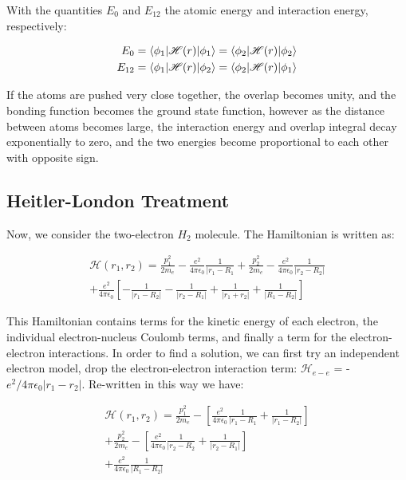 With the quantities $E_0$ and $E_{12}$ the atomic energy and interaction energy, respectively:

\begin{eqnarray}
E_0=\braket{\phi_1|\mathscr{H}(r)|\phi_1} =\braket{\phi_2|\mathscr{H}(r)|\phi_2}\\
E_{12}=\braket{\phi_1|\mathscr{H}(r)|\phi_2} =\braket{\phi_2|\mathscr{H}(r)|\phi_1}
\end{eqnarray}

If the atoms are pushed very close together, the overlap becomes unity, and the bonding function becomes the ground state function, however as the distance between atoms becomes large, the interaction energy and overlap integral decay exponentially to zero, and the two energies become proportional to each other with opposite sign. 


\subsection{Heitler-London Treatment}

Now, we consider the two-electron $H_2$ molecule. The Hamiltonian is written as:

\begin{eqnarray}
\mathscr{H}(r_1,r_2) = \frac{p^2_1}{2m_e}-\frac{e^2}{4\pi\epsilon_0}\frac{1}{|r_1-R_1}+\frac{p_2^2}{2m_e}-\frac{e^2}{4\pi\epsilon_0}\frac{1}{|r_2-R_2|} \\
+\frac{e^2}{4\pi\epsilon_0}\left[-\frac{1}{|r_1-R_2|}-\frac{1}{|r_2-R_1|}+\frac{1}{|r_1+r_2|}+\frac{1}{|R_1-R_2|}\right]
\label{HLHamiltonian}
\end{eqnarray}

This Hamiltonian contains terms for the kinetic energy of each electron, the individual electron-nucleus Coulomb terms, and finally a term for the electron-electron  interactions. In order to find a solution, we can first try  an independent electron model, drop the electron-electron interaction term: $\mathscr{H}_{e-e}$ = -$e^2/4\pi\epsilon_0|r_1-r_2|$. Re-written in this way we have:

\begin{eqnarray}
\mathscr{H}(r_1,r_2)=\frac{p_1^2}{2m_e}-\left[\frac{e^2}{4\pi\epsilon_0}\frac{1}{|r_1-R_1}+\frac{1}{|r_1-R_2|}\right] \\
+\frac{p_2^2}{2m_e}-\left[\frac{e^2}{4\pi\epsilon_0}\frac{1}{|r_2-R_2}+\frac{1}{|r_2-R_1|}\right] \\
+\frac{e^2}{4\pi\epsilon_0}\frac{1}{|R_1-R_2|}
\label{IndepElecHamiltonian}
\end{eqnarray}

